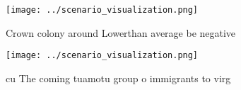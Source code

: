 \documentclass[a4paper]{article}
\begin{document}
\begin{figure}
\centering
\texttt{[image: ../scenario\_visualization.png]}
\caption{Crown colony around Lowerthan average be negative
}
\end{figure}
 
\begin{figure}
\centering
\texttt{[image: ../scenario\_visualization.png]}
\caption{ cu The coming tuamotu group o immigrants to virg
}
\end{figure}
 
\end{document}
